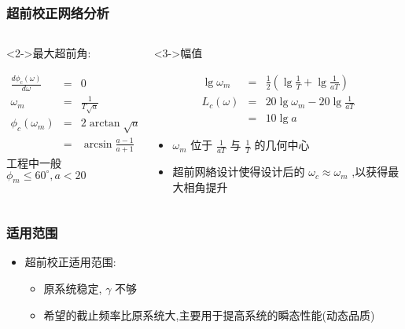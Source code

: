 \documentclass[table]{beamer}
\begin{document}
\begin{frame}
\frametitle{超前校正网络分析}
\label{sec-1-2}
\begin{columns}
\begin{column}{0.5\textwidth}
\begin{block}<2->{最大超前角:}
\label{sec-1-2-1}

\begin{eqnarray*}
\frac{d\phi_c(\omega)}{d\omega} & = & 0 \\
\omega_m &=& \frac{1}{T\sqrt{a}}\\
\phi_c(\omega_m) &=& 2\arctan\sqrt{a}-\frac{\pi}{2}\\
                 &=& \arcsin\frac{a-1}{a+1}
\end{eqnarray*}
工程中一般 $\phi_m\leq 60^{\circ},a<20$ 
\end{block}
\end{column}
\begin{column}{0.5\textwidth}
\begin{block}<3->{幅值}
\label{sec-1-2-2}

\begin{eqnarray*}
\lg\omega_m &=& \frac{1}{2}(\lg\frac{1}{T}+\lg\frac{1}{aT}) \\
L_c(\omega) &=& 20\lg\omega_m-20\lg\frac{1}{aT} \\
            &=& 10\lg a
\end{eqnarray*}
\begin{itemize}
\item <4-> $\omega_m$ 位于 $\frac{1}{aT}$ 与 $\frac{1}{T}$ 的几何中心
\item <5-> 超前网絡设计使得设计后的 $\omega_c\approx\omega_m$ ,以获得最大相角提升
\end{itemize}
\end{block}
\end{column}
\end{columns}
\end{frame}
\begin{frame}
\frametitle{适用范围}
\label{sec-1-3}

\begin{itemize}
\item 超前校正适用范围:
\begin{itemize}
\item <2->原系统稳定, $\gamma$ 不够
\item <3->希望的截止频率比原系统大,主要用于提高系统的瞬态性能(动态品质)
\end{itemize}
\end{itemize}
\end{frame}
\end{document}
